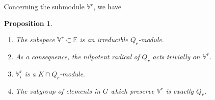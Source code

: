 \documentclass[JEP,XML,SOM,Unicode,NoFloatCountersInSection]{cedram}
\theoremstyle{plain}
\newtheorem{prop}[theo]{Proposition}
\theoremstyle{definition}
\let\rgy r
\newcommand{\bE}{\mathbb{E}}
\newcommand{\Vr}{\mathbb{V}^\rgy}
\begin{document}
Concerning the submodule $\Vr$, we have

\skpt
\begin{prop}
\label{prop:stabV}
\begin{enumerate}
\item \label{item:parabolic}
The subspace $\Vr \subset \bE$ is an irreducible $Q_\rgy$-module.
\item \label{item:reductive-Q}
As a consequence, the nilpotent radical of $Q_\rgy$ acts trivially on $\Vr$.
\item $\Vr_i$ is a $K\cap Q_\rgy$-module.
\item \label{item:stabilizer-V}
The subgroup of elements in $G$ which preserve $\Vr$ is exactly $Q_\rgy$.
\end{enumerate}
\end{prop}
\end{document}
